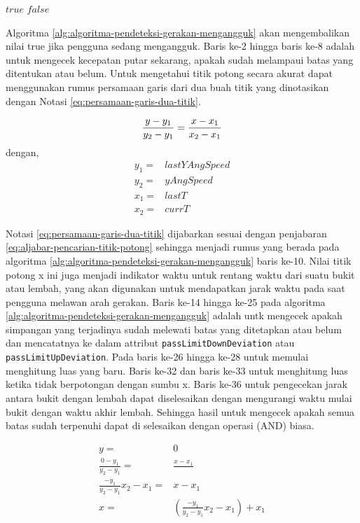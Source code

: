 \documentclass[a4paper,twoside]{article}
\begin{document}
\begin{enumerate}
\begin{algorithm}
\begin{algorithmic}[1]
			\Return $true$
		\Else
			\Return $false$
		\EndIf
	\EndFunction  
	\end{algorithmic}
\end{algorithm}

Algoritma \ref{alg:algoritma-pendeteksi-gerakan-mengangguk} akan mengembalikan nilai true jika pengguna sedang mengangguk. Baris ke-2 hingga baris ke-8 adalah untuk mengecek kecepatan putar sekarang, apakah sudah melampaui batas yang ditentukan atau belum. Untuk mengetahui titik potong secara akurat dapat menggunakan rumus persamaan garis dari dua buah titik yang dinotasikan dengan Notasi \ref{eq:persamaan-garis-dua-titik}.   

\begin{equation}
		\frac{y-y_1}{y_2-y_1} = \frac{x-x_1}{x_2-x_1} \\
\label{eq:persamaan-garis-dua-titik}
\end{equation}
dengan,
\[
	\begin{split}
		y_1 = & lastYAngSpeed\\
		y_2 = & yAngSpeed\\
		x_1 = & lastT\\
		x_2 = & currT
	\end{split}
\]

Notasi \ref{eq:persamaan-garis-dua-titik} dijabarkan sesuai dengan penjabaran \ref{eq:aljabar-pencarian-titik-potong} sehingga menjadi rumus yang berada pada algoritma \ref{alg:algoritma-pendeteksi-gerakan-mengangguk} baris ke-10. Nilai titik potong x ini juga menjadi indikator waktu untuk rentang waktu dari suatu bukit atau lembah, yang akan digunakan untuk mendapatkan jarak waktu pada saat pengguna melawan arah gerakan. Baris ke-14 hingga ke-25 pada algoritma \ref{alg:algoritma-pendeteksi-gerakan-mengangguk} adalah untk mengecek apakah simpangan yang terjadinya sudah melewati batas yang ditetapkan atau belum dan mencatatnya ke dalam attribut \texttt{passLimitDownDeviation} atau \texttt{passLimitUpDeviation}. Pada baris ke-26 hingga ke-28 untuk memulai menghitung luas yang baru. Baris ke-32 dan baris ke-33 untuk menghitung luas ketika tidak berpotongan dengan sumbu x. Baris ke-36 untuk pengecekan jarak antara bukit dengan lembah dapat diselesaikan dengan mengurangi waktu mulai bukit dengan waktu akhir lembah. Sehingga hasil untuk mengecek apakah semua batas sudah terpenuhi dapat di selesaikan dengan operasi (AND) biasa. 

\begin{equation}
	\begin{split}
		y = & 0\\		
		\frac{0-y_1}{y_2-y_1} = & \frac{x-x_1}{} \\
		\frac{-y_1}{y_2-y_1} x_2-x_1 = & x-x_1 \\
		x = & (\frac{-y_1}{y_2-y_1} x_2-x_1) +x_1
	\end{split}
\label{eq:aljabar-pencarian-titik-potong}
\end{equation}



\end{enumerate}
\end{document}
